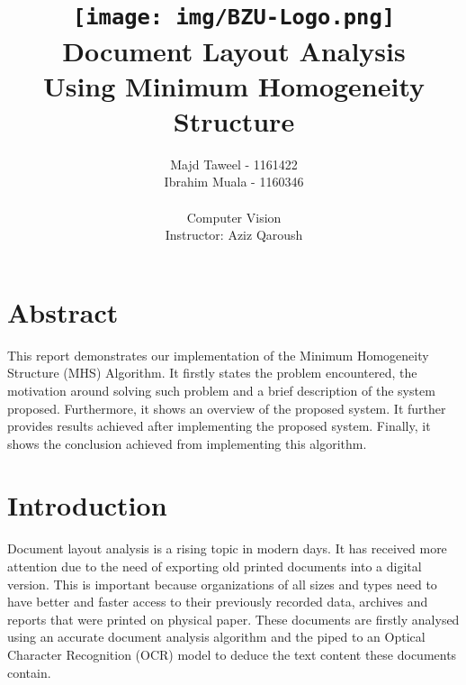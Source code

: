 \documentclass[12pt]{report}
\begin{document}
    \title{
        \texttt{[image: img/BZU-Logo.png]}\\
        Document Layout Analysis\\
        \footnotesize Using Minimum Homogeneity Structure
    }

    \author{
        {Majd Taweel - 1161422}\\
        {Ibrahim Muala - 1160346}\\\\

        {Computer Vision}\\
        {Instructor: Aziz Qaroush}
    }
    \maketitle

    \chapter*{Abstract}

    This report demonstrates our implementation of the Minimum Homogeneity Structure (MHS) Algorithm.
    It firstly states the problem encountered, the motivation around solving such problem and a brief description
    of the system proposed.
    Furthermore, it shows an overview of the proposed system.
    It further provides results achieved after implementing the proposed system.
    Finally, it shows the conclusion achieved from implementing this algorithm.

    \tableofcontents

    \listoffigures

    \chapter{Introduction}
    \setcounter{page}{1}

    Document layout analysis is a rising topic in modern days.
    It has received more attention due to the need of exporting old printed documents into a digital version.
    This is important because organizations of all sizes and types need to have better and faster
    access to their previously recorded data, archives and reports that were printed on physical paper.
    These documents are firstly analysed using an accurate document analysis algorithm and the piped to an
    Optical Character Recognition (OCR) model to deduce the text content these documents contain.
\end{document}
